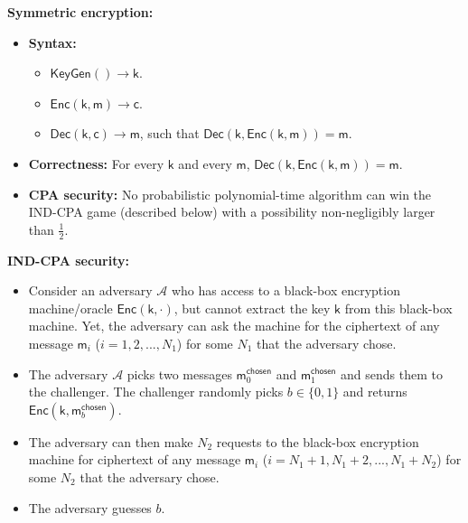 \documentclass{article}
\newcommand{\msf}[1]{\mathsf{#1}}
\newcommand{\parhead}[1]{\noindent \textbf{#1}}
\begin{document}
\parhead{Symmetric encryption:}
\begin{itemize}
    \item {\bf Syntax:}
    \begin{itemize}
        \item $\msf{KeyGen}()\rightarrow\msf{k}$.
        
        \item $\msf{Enc}(\msf{k},\msf{m})\rightarrow\msf{c}$.
        
        \item $\msf{Dec}(\msf{k},\msf{c})\rightarrow\msf{m}$, such that    $\msf{Dec}(\msf{k},\msf{Enc}(\msf{k},\msf{m}))=\msf{m}$.
    \end{itemize}
    
    \item {\bf Correctness:} For every $\msf{k}$ and every $\msf{m}$,  $\msf{Dec}(\msf{k},\msf{Enc}(\msf{k},\msf{m}))=\msf{m}$.
    
    \item {\bf CPA security:} No probabilistic polynomial-time algorithm can win the IND-CPA game (described below) with a possibility non-negligibly larger than $\frac{1}{2}$.
\end{itemize}

\newpage
\parhead{IND-CPA security:}
\begin{itemize}
    \item Consider an adversary $\mathcal{A}$ who has access to a black-box encryption machine/oracle $\msf{Enc}(\msf{k},\cdot)$, but cannot extract the key $\msf{k}$ from this black-box machine. Yet, the adversary can ask the machine for the ciphertext of any message $\msf{m}_i$ ($i=1,2,..., N_1$) for some $N_1$ that the adversary chose.
    
    \item The adversary $\mathcal{A}$ picks two messages $\msf{m}^\msf{chosen}_0$ and $\msf{m}^\msf{chosen}_1$ and sends them to the challenger. The challenger randomly picks $b\in\{0,1\}$ and returns $\msf{Enc}(\msf{k},\msf{m}^\msf{chosen}_b)$.
    
    \item The adversary can then make $N_2$ requests to the black-box encryption machine for ciphertext of any message $\msf{m}_i$ ($i=N_1+1,N_1+2,..., N_1+N_2$) for some $N_2$ that the adversary chose.
    
    \item The adversary guesses $b$.
\end{itemize}
\end{document}
